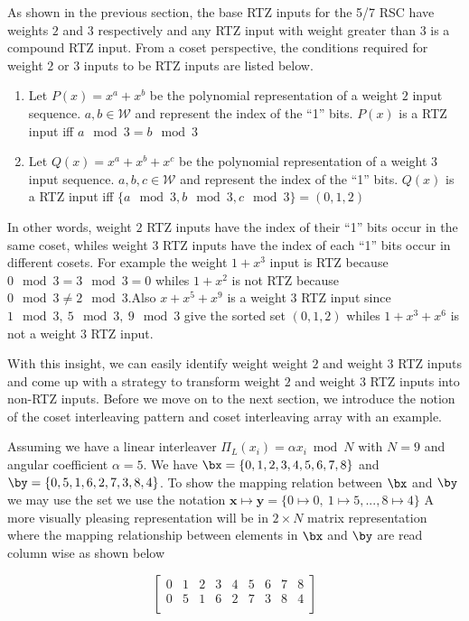 \documentclass[11pt, oneside, dvipdfmx]{book}
\begin{document}
As shown in the previous section, the base RTZ inputs for the 5/7 RSC have weights $2$ and $3$ respectively and any RTZ input with weight greater than $3$ is a compound RTZ input. From a coset perspective, the conditions required for weight $2$ or $3$ inputs to be RTZ inputs are listed below.

\begin{enumerate}
\item Let $P(x)=x^a+x^b$ be the polynomial representation of a weight $2$ input sequence. $a,b \in \mathcal{W}$ and represent the index of the ``1'' bits. $P(x)$ is a RTZ input iff $a \mod 3 = b \mod 3$

\item Let $Q(x) =x^a+x^b+x^c$ be the polynomial representation of a weight $3$ input sequence. $a,b,c \in \mathcal{W}$ and represent the index of the ``1'' bits. $Q(x)$ is a RTZ input iff $\{a \mod 3,b \mod 3,c \mod 3\} =(0,1,2)$

\end{enumerate}

In other words, weight $2$ RTZ inputs have the index of their ``1'' bits occur in the same coset, whiles weight $3$ RTZ inputs have the index of each ``1'' bits occur in different cosets. For example the weight $1+x^3$ input is RTZ because $0 \mod 3 = 3 \mod 3 =0$ whiles $1+x^2$ is not RTZ because $0 \mod 3 \neq 2 \mod 3$.Also $x+x^5+x^9$ is a weight $3$ RTZ input since $1 \mod 3,~5 \mod 3,~9 \mod 3$ give the sorted set $(0,1,2)$ whiles $1+x^3+x^6$ is not a weight $3$ RTZ input.

With this insight, we can easily identify weight weight $2$ and weight $3$ RTZ inputs and come up with a strategy to transform weight $2$ and weight $3$ RTZ inputs into non-RTZ inputs. Before we move on to the next section, we introduce the notion of the coset interleaving pattern and coset interleaving array with an example.

Assuming we have a linear interleaver $\Pi_L(x_i) =\alpha x_i \bmod N$ with $N=9$ and angular coefficient $\alpha=5$. We have $\bx=\{0,1,2,3,4,5,6,7,8\}$ and $\by=\{0,5,1,6,2,7,3,8,4\}$.
To show the mapping relation between $\bx$ and $\by$ we may use the set we use the notation  $\mathbf{x} \mapsto \mathbf{y} =\{0 \mapsto 0,~1 \mapsto 5,...,8 \mapsto 4 \}$
A more visually pleasing representation will be in $2 \times N$ matrix representation where the mapping relationship between elements in $\bx$ and $\by$ are read column wise as shown below

$$  
 \begin{bmatrix}
0 & 1 & 2 & 3 & 4 & 5 & 6 & 7 & 8 \\
0 & 5 & 1 & 6 & 2 & 7 & 3 & 8 & 4 \\
\end{bmatrix}
$$
\end{document}
